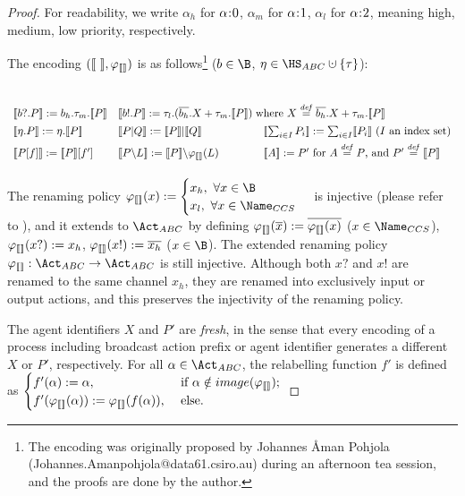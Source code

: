 \documentclass[adraft,hidelinks]{eptcs}
\begin{document}
%
\begin{proof}
For readability, we write $\alpha_h$ for $\alpha\hspace{-0.8mm}:\hspace{-0.8mm} 0$, $\alpha_m$ for $\alpha\hspace{-0.8mm}:\hspace{-0.8mm} 1$, $\alpha_l$ for $\alpha\hspace{-0.8mm}:\hspace{-0.8mm} 2$, meaning high, medium, low priority, respectively.

The encoding $\enc$ is as follows\footnote{The encoding was originally proposed by Johannes \AA man Pohjola (Johannes.Amanpohjola@data61.csiro.au) during an afternoon tea session, and the proofs are done by the author.} ($b\in\B$, $\eta\in\HS_{ABC}\dcup\{\tau\}$):
\begin{center}
$\begin{array}{ll}
  \\ [2ex]
\end{array}$
$\begin{array}{lll}
  \bkt{b?.P} := b_h.\tau_m.\bkt{P} &
  \bkt{b!.P} := \tau_l.(\overline{b_h}.X + \tau_m.\bkt{P}) &
  \hspace{-2.5mm}\text{where }X \defis \overline{b_h}.X + \tau_m.\bkt{P}
  \\[1ex]
  \bkt{\eta.P} := \eta. \bkt{P} &
  \bkt{P | Q} := \bkt{P} | \bkt{Q} &
  \bkt{\sum_{i\in I}P_i} := \sum_{i\in I}\bkt{P_i}\ (I \text{ an index set})
  \\[1ex]
  \bkt{P[f]} := \bkt{P}[f'] &
  \bkt{P\backslash L} := \bkt{P} \backslash \ren{L} &
  \bkt{A} := P' \text{ for } A\defis P \text{, and } P'\defis\bkt{P}
  \\[1ex]
\end{array}$
\end{center}

The renaming policy
$\ren{x} :=
\begin{cases}
  x_h, \ \forall x\in\B\\
  x_l, \ \forall x \in \Name_{CCS}
\end{cases}$
is injective (please refer to ), and it extends to $\Act_{ABC}$ by defining $\ren{\overline{x}}:=\overline{\ren{x}}$ ($x\in\Name_{CCS}$), $\ren{x?} := x_h$, $\ren{x!} := \overline{x_h}$ ($x\in\B$).
The extended renaming policy $\varphi_{\bkt{}}: \Act_{ABC}\to \Act_{ABC}$ is still injective.
Although both $x?$ and $x!$ are renamed to the same channel $x_h$, they are renamed into exclusively input or output actions, and this preserves the injectivity of the renaming policy.

The agent identifiers $X$ and $P'$ are \emph{fresh}, in the sense that every encoding of a process including broadcast action prefix  or agent identifier generates a different $X$ or $P'$, respectively.
For all $\alpha\in\Act_{ABC}$, the relabelling function $f'$ is defined as
$\begin{cases}
  f'(\alpha) := \alpha, & \text{ if } \alpha \notin image(\varphi_{\bkt{}}); \\
  f'(\ren{\alpha}) := \ren{f(\alpha)}, & \text{ else. }
\end{cases}$


\end{proof}
\end{document}
